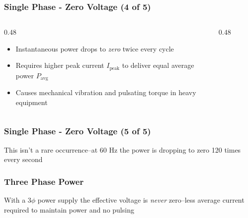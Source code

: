 \begin{frame}
    \frametitle{Single Phase - Zero Voltage (4 of 5)}

    \begin{columns}
        \begin{column}{0.48\linewidth}
            \begin{itemize}
                \item Instantaneous power drops to \emph{zero} twice every cycle
                \item Requires higher peak current $I_{\text{peak}}$ to deliver equal average power $P_{\text{avg}}$
                \item Causes mechanical vibration and pulsating torque in heavy equipment
            \end{itemize}
        \end{column}
        \begin{column}{0.48\linewidth}
            \begin{figure}
                \centering
                \resizebox{\columnwidth}{!}{
                    
                }
            \end{figure}
        \end{column}
    \end{columns}
\end{frame}

\begin{frame}
    \frametitle{Single Phase - Zero Voltage (5 of 5)}

    \begin{figure}
        \centering
        \resizebox{0.75\linewidth}{!}{
            
        }
    \end{figure}

    \centering
    \vspace{0.5em}
    {\footnotesize This isn't a rare occurrence--at 60 Hz the power is dropping to zero 120 times every second\par}
\end{frame}

\begin{frame}
    \frametitle{Three Phase Power}

    \begin{figure}
        \centering
        \resizebox{0.75\linewidth}{!}{
            
        }
    \end{figure}

    \centering
    \vspace{0.5em}
    {\footnotesize With a 3$\phi$ power supply the effective voltage is \emph{never} zero--less average current required to maintain power and no pulsing\par}
\end{frame}

